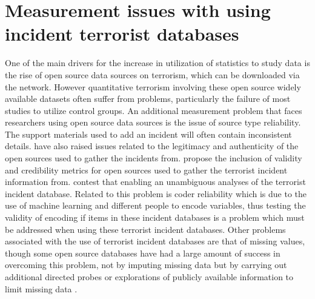 \section{Measurement issues with using incident terrorist databases} \label{sec:markermeasdif}
One of the main drivers for the increase in utilization of statistics to study data is the rise of open source data sources on terrorism, which can be downloaded via the network. However quantitative terrorism involving these open source widely available datasets often suffer from problems, particularly the failure of most studies to utilize control groups. An additional measurement problem that faces researchers using open source data sources is the issue of source type reliability. The support materials used to add an incident  will often contain  inconsistent details. \citep{ackerman2016speaking} have also raised issues related to the legitimacy and authenticity of the open sources used to gather the incidents from. \citep{ackerman2016speaking} propose the inclusion of validity and credibility metrics for  open sources used to gather the terrorist incident information from. \citep{ackerman2016speaking} contest that enabling  an unambiguous analyses of the terrorist incident database. Related to this problem is coder reliability which is due to the use of machine learning and different people to encode variables, thus testing the validity of encoding if items in these incident databases is a problem which must be addressed when using these terrorist incident databases. 
Other problems associated with the use of terrorist incident databases are that of missing values, though some open source databases have had a large amount of success in overcoming this problem, not by imputing missing data but by carrying out additional directed  probes or explorations of publicly available information to limit missing data \citep{parkin2012developing}.


